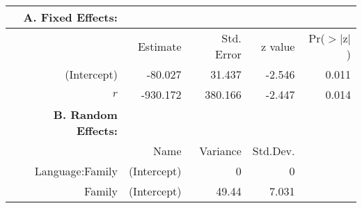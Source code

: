 \begin{tabular}{rrrrr}
 {\bf A. Fixed Effects:} \\
\hline
 & Estimate & Std. Error & z value & Pr($>$$|$z$|$) \\ 
  \hline
(Intercept) & -80.027 & 31.437 & -2.546 & 0.011 \\ 
  $r$ & -930.172 & 380.166 & -2.447 & 0.014 \\ 

\hline \hline
{\bf B. Random Effects:} \\
\hline
& Name & Variance & Std.Dev. \\
\hline
Language:Family & (Intercept) & 0 & 0 \\
Family & (Intercept) & 49.44 & 7.031 \\
\end{tabular}

